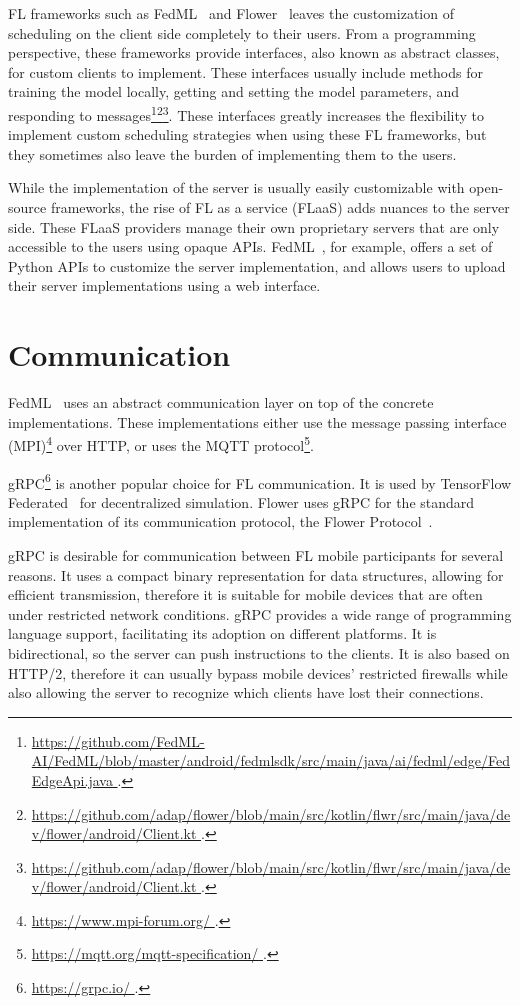 \documentclass[conference]{IEEEtran}
\begin{document}
FL frameworks such as FedML~\cite{he2020fedml} and
Flower~\cite{beutel2020flower} leaves the customization of
scheduling on the client side completely to their users.
From a programming perspective,
these frameworks provide interfaces,
also known as abstract classes,
for custom clients to implement.
These interfaces usually include methods for
training the model locally,
getting and setting the model parameters,
and responding to messages\footnote{\url{
    https://github.com/FedML-AI/FedML/blob/master/android/fedmlsdk/src/main/java/ai/fedml/edge/FedEdgeApi.java
}.}\footnote{\url{
    https://github.com/adap/flower/blob/main/src/kotlin/flwr/src/main/java/dev/flower/android/Client.kt
}.}\footnote{\url{
    https://github.com/adap/flower/blob/main/src/kotlin/flwr/src/main/java/dev/flower/android/Client.kt
}.}.
These interfaces greatly increases the flexibility to
implement custom scheduling strategies when using these FL frameworks,
but they sometimes also leave the burden of implementing them to the users.

While the implementation of the server is usually easily customizable with
open-source frameworks,
the rise of FL as a service (FLaaS)
adds nuances to the server side.
These FLaaS providers manage their own proprietary servers that
are only accessible to the users using opaque APIs.
FedML~\cite{he2020fedml}, for example,
offers a set of Python APIs to customize the server implementation,
and allows users to upload their server implementations using a web interface.

\section{Communication}

FedML~\cite{he2020fedml} uses an abstract communication layer on top of
the concrete implementations.
These implementations either use the message passing interface
(MPI)\footnote{\url{
    https://www.mpi-forum.org/
}.} over HTTP,
or uses the MQTT protocol\footnote{\url{
    https://mqtt.org/mqtt-specification/
}.}.

gRPC\footnote{\url{
    https://grpc.io/
}.} is another popular choice for FL communication.
It is used by TensorFlow Federated~\cite{tff} for decentralized simulation.
Flower uses gRPC for the standard implementation of
its communication protocol, the Flower Protocol~\cite{beutel2020flower}.

gRPC is desirable for communication between FL mobile participants for
several reasons.
It uses a compact binary representation for data structures,
allowing for efficient transmission,
therefore it is suitable for mobile devices that
are often under restricted network conditions.
gRPC provides a wide range of programming language support,
facilitating its adoption on different platforms.
It is bidirectional, so the server can push instructions to the clients.
It is also based on HTTP/2,
therefore it can usually bypass mobile devices' restricted firewalls while
also allowing the server to recognize which clients have lost their connections.
\end{document}
